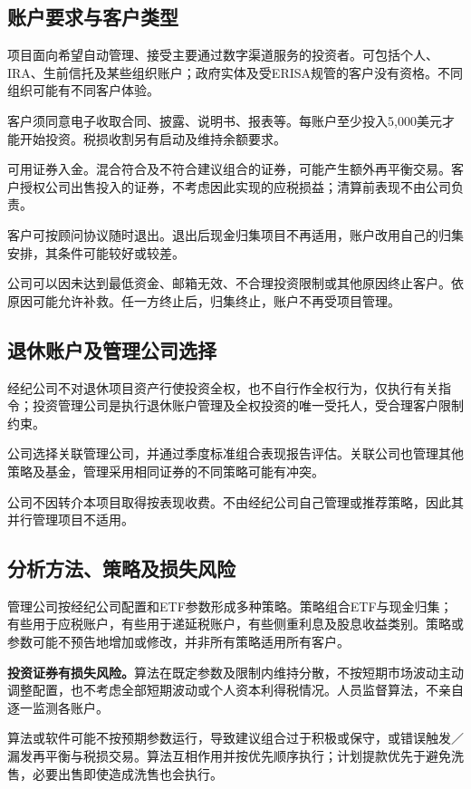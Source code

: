 \documentclass[UTF8,fontset=none,11pt,a4paper]{ctexart}
\begin{document}
\subsection*{账户要求与客户类型}
项目面向希望自动管理、接受主要通过数字渠道服务的投资者。可包括个人、IRA、生前信托及某些组织账户；政府实体及受ERISA规管的客户没有资格。不同组织可能有不同客户体验。


客户须同意电子收取合同、披露、说明书、报表等。每账户至少投入5,000美元才能开始投资。税损收割另有启动及维持余额要求。


可用证券入金。混合符合及不符合建议组合的证券，可能产生额外再平衡交易。客户授权公司出售投入的证券，不考虑因此实现的应税损益；清算前表现不由公司负责。


客户可按顾问协议随时退出。退出后现金归集项目不再适用，账户改用自己的归集安排，其条件可能较好或较差。


公司可以因未达到最低资金、邮箱无效、不合理投资限制或其他原因终止客户。依原因可能允许补救。任一方终止后，归集终止，账户不再受项目管理。


\subsection*{退休账户及管理公司选择}
经纪公司不对退休项目资产行使投资全权，也不自行作全权行为，仅执行有关指令；投资管理公司是执行退休账户管理及全权投资的唯一受托人，受合理客户限制约束。


公司选择关联管理公司，并通过季度标准组合表现报告评估。关联公司也管理其他策略及基金，管理采用相同证券的不同策略可能有冲突。


公司不因转介本项目取得按表现收费。不由经纪公司自己管理或推荐策略，因此其并行管理项目不适用。


\subsection*{分析方法、策略及损失风险}
管理公司按经纪公司配置和ETF参数形成多种策略。策略组合ETF与现金归集；有些用于应税账户，有些用于递延税账户，有些侧重利息及股息收益类别。策略或参数可能不预告地增加或修改，并非所有策略适用所有客户。


\textbf{投资证券有损失风险。}算法在既定参数及限制内维持分散，不按短期市场波动主动调整配置，也不考虑全部短期波动或个人资本利得税情况。人员监督算法，不亲自逐一监测各账户。


算法或软件可能不按预期参数运行，导致建议组合过于积极或保守，或错误触发／漏发再平衡与税损交易。算法互相作用并按优先顺序执行；计划提款优先于避免洗售，必要出售即使造成洗售也会执行。
\end{document}
